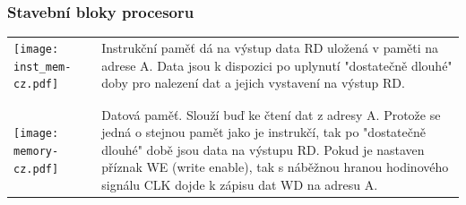 \documentclass{beamer}
\begin{document}
\begin{frame}
\frametitle{Stavební bloky procesoru}

\begin{table}
\footnotesize
\begin{tabular}{m{1.7cm} m{9.4cm}}
\hfill \texttt{[image: inst\_mem-cz.pdf]} & Instrukční paměť dá na výstup data RD uložená v paměti na adrese A. Data jsou k dispozici po uplynutí "dostatečně dlouhé" doby pro nalezení dat a jejich vystavení na výstup RD.\\
\phantom{X} & \phantom{X} \\
\phantom{X} & \phantom{X} \\
\hfill \texttt{[image: memory-cz.pdf]} & Datová paměť. Slouží buď ke čtení dat z adresy A. Protože se jedná o stejnou pamět jako je instrukčí, tak po "dostatečně dlouhé" době jsou data na výstupu RD. Pokud je nastaven příznak WE (write enable), tak s náběžnou hranou hodinového signálu CLK dojde k zápisu dat WD na adresu A.\\ 
\end{tabular}
\end{table}

\end{frame}
\end{document}
